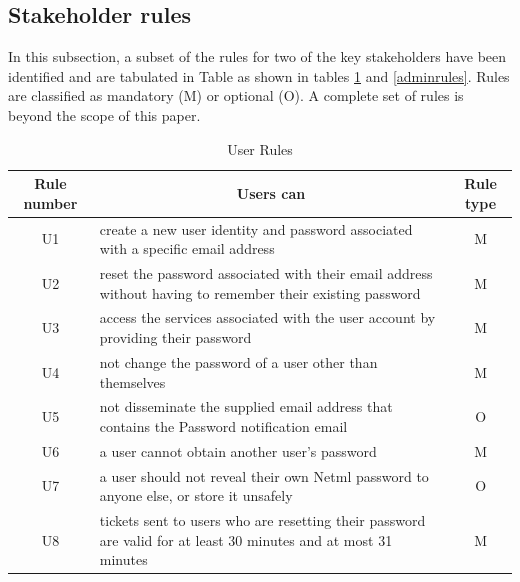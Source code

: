 \subsection{Stakeholder rules}\label{rules}

In this subsection, a subset of the rules for two of the key stakeholders have been
identified and are tabulated in Table  as
shown in tables \ref{Userrules} and   \ref{adminrules}.  Rules are classified as mandatory (M) 
or optional (O).  A complete set of rules is beyond the scope of this paper.

\begin{table}[!htbp]         %
\vspace{5mm}
	\begin{center}
\begin{tabular}{|c|p{4.2cm}|c|}
\hline 
 \textbf{ Rule number} & \multicolumn{1}{|c|}{\textbf{Users can}} & \textbf{Rule type}\\ 
\hline
U1 & create a new user identity and password associated with a specific email address & M  \\
\hline
U2 & reset the password associated with their email address without having to remember their existing password & M \\
\hline
U3 & access the services associated with the user account by providing their
password & M \\
\hline
U4 & not change the password of a user other than themselves & M  \\
\hline
U5 & not disseminate the supplied  email address that contains the  Password notification email & O \\
\hline 
U6 & a user cannot obtain another user's password &  M \\ 
\hline 
U7 & a user should not reveal their own Netml password to anyone else, or store it unsafely &  O \\ 
\hline 
U8 & tickets sent to users who are resetting their password are valid for at least 30 minutes and at most 31 minutes &  M \\ 
\hline 
	\end{tabular}
	\end{center}
	\caption{ User Rules }
\label{Userrules}
\end{table}


